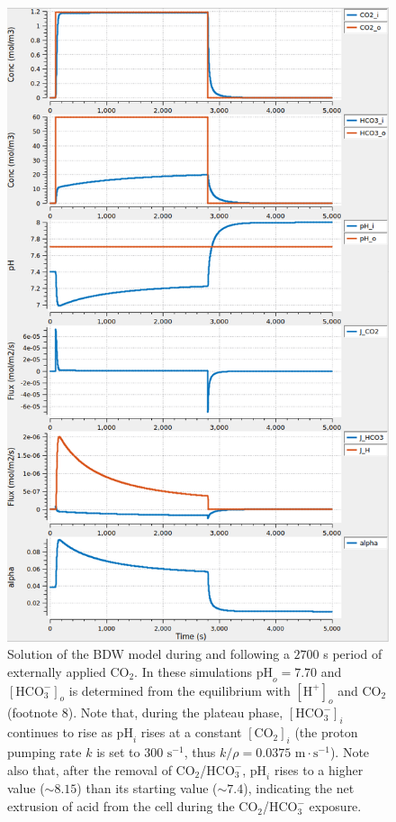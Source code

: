 \documentclass[fleqn,10pt]{physiome}
\begin{document}
\begin{figure}
\centering
\includegraphics[scale=0.4]{Figure 4.png}
\caption{\label{fig:4} Solution of the BDW model during and following a $2700$ s period of externally applied $\mathrm{CO_2}$. In these simulations $\mathrm{pH}_o=7.70$ and $\mathrm{[HCO_3^-]}_o$ is determined from the equilibrium with $\mathrm{[H^+]}_o$ and $\mathrm{CO_2}$ (footnote $8$). Note that, during the plateau phase, $\mathrm{[HCO_3^-]}_i$ continues to rise as $\mathrm{pH}_i$ rises at a constant $\mathrm{[CO_2]}_i$ (the proton pumping rate $k$ is set to $300$ $\mathrm{s^{-1}}$, thus $k/\rho= 0.0375$ $\mathrm{m\cdot s^{-1}}$). Note also that, after the removal of $\mathrm{CO_2}$/$\mathrm{HCO_3^-}$, $\mathrm{pH}_i$ rises to a higher value ($\sim 8.15$) than its starting value ($\sim 7.4$), indicating the net extrusion of acid from the cell during the $\mathrm{CO_2}$/$\mathrm{HCO_3^-}$ exposure.}
\end{figure}
\end{document}

